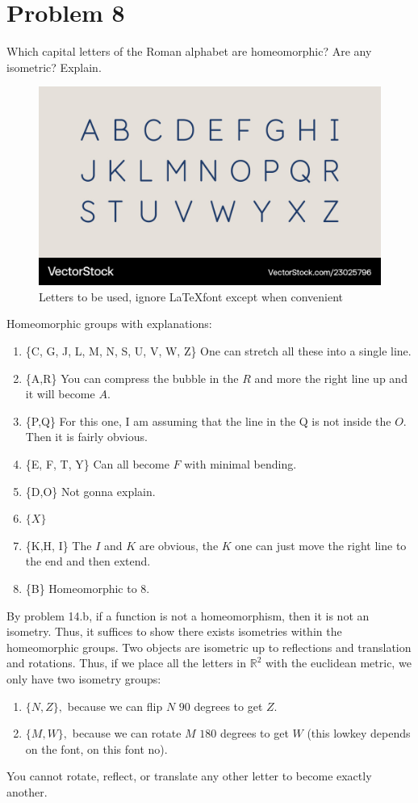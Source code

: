 \documentclass[11pt]{article}
\newcommand{\bbR}{\mathbb{R}}
\begin{document}
\section*{Problem 8}
\begin{problem}
    Which capital letters of the Roman alphabet are homeomorphic? Are any
 isometric? Explain.
\end{problem}
\begin{figure}[h]
    \centering
    \includegraphics[width=0.5\linewidth]{Images/HW2.1.png}
    \caption{Letters to be used, ignore \LaTeX font except when convenient}
\end{figure}
\begin{solution}
    Homeomorphic groups with explanations:
    \begin{enumerate}
        \item \{C, G, J, L, M, N, S, U, V, W, Z\} One can stretch all these into a single line.
        \item \{A,R\} You can compress the bubble in the $R$ and more the right line up and it will become $A.$
        \item \{P,Q\} For this one, I am assuming that the line in the Q is not inside the $O.$ Then it is fairly obvious.
        \item \{E, F, T, Y\} Can all become $F$ with minimal bending.
        \item \{D,O\} Not gonna explain.
        \item $\{X\}$
        \item \{K,H, I\} The $I$ and $K$ are obvious, the $K$ one can just move the right line to the end and then extend.
        \item \{B\} Homeomorphic to $8.$
    \end{enumerate}
\end{solution}
\begin{solution}
    By problem 14.b, if a function is not a homeomorphism, then it is not an isometry. Thus, it suffices to show there exists isometries within the homeomorphic groups. Two objects are isometric up to reflections and translation and rotations. Thus, if we place all the letters in $\bbR^2$ with the euclidean metric, we only have two isometry groups:
    \begin{enumerate}
        \item $\{N,Z\},$ because we can flip $N$ $90$ degrees to get $Z.$
        \item $\{M,W\},$ because we can rotate $M$ $180$ degrees to get $W$ (this lowkey depends on the font, on this font no).
    \end{enumerate}
    You cannot rotate, reflect, or translate any other letter to become exactly another.
\end{solution}
\end{document}

